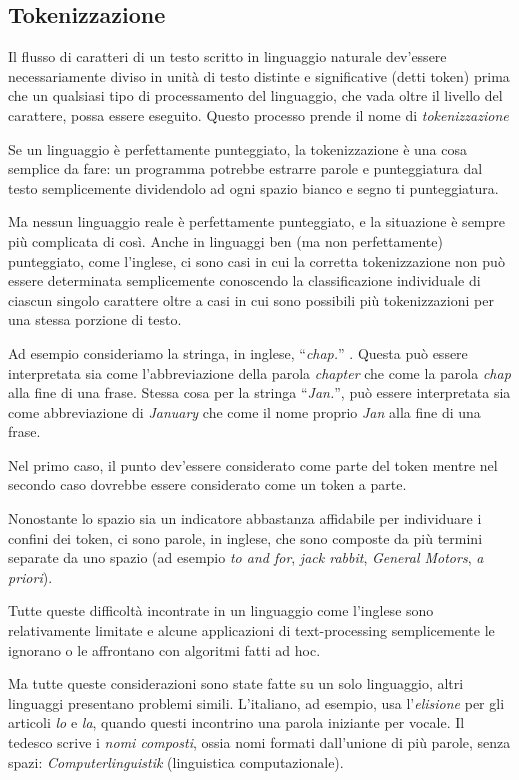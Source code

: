 \subsection{Tokenizzazione}

Il flusso di caratteri di un testo scritto in linguaggio naturale dev'essere
necessariamente diviso in unit\`a di testo distinte e significative (detti token)
prima che un qualsiasi tipo di processamento del linguaggio, che vada oltre il
livello del carattere, possa essere eseguito. Questo processo prende il nome di
\emph{tokenizzazione}

Se un linguaggio \`e perfettamente punteggiato, la tokenizzazione \`e una cosa
semplice da fare: un programma potrebbe estrarre parole e punteggiatura dal testo
semplicemente dividendolo ad ogni spazio bianco e segno ti punteggiatura.

Ma nessun linguaggio reale \`e perfettamente punteggiato, e la situazione \`e
sempre pi\`u complicata di cos\`i. Anche in linguaggi ben (ma non perfettamente)
punteggiato, come l'inglese, ci sono casi in cui la corretta tokenizzazione non
pu\`o essere determinata semplicemente conoscendo la classificazione individuale
di ciascun singolo carattere oltre a casi in cui sono possibili pi\`u tokenizzazioni
per una stessa porzione di testo.

Ad esempio consideriamo la stringa, in inglese, ``\emph{chap.}'' . Questa pu\`o
essere interpretata sia come l'abbreviazione della parola \emph{chapter} che come
la parola \emph{chap} alla fine di una frase. Stessa cosa per la stringa ``\emph{Jan.}'',
pu\`o essere interpretata sia come abbreviazione di \emph{January} che come il
nome proprio \emph{Jan} alla fine di una frase.

Nel primo caso, il punto dev'essere considerato come parte del token mentre nel
secondo caso dovrebbe essere considerato come un token a parte.

Nonostante lo spazio sia un indicatore abbastanza affidabile per individuare i
confini dei token, ci sono parole, in inglese, che sono composte da pi\`u termini
separate da uno spazio (ad esempio \emph{to and for}, \emph{jack rabbit},
\emph{General Motors}, \emph{a priori}).

Tutte queste difficolt\`a incontrate in un linguaggio come l'inglese sono
relativamente limitate e alcune applicazioni di text-processing semplicemente le
ignorano o le affrontano con algoritmi fatti ad hoc.

Ma tutte queste considerazioni sono state fatte su un solo linguaggio, altri
linguaggi presentano problemi simili. L'italiano, ad esempio, usa l'\emph{elisione}
per gli articoli \emph{lo} e \emph{la}, quando questi incontrino una parola
iniziante per vocale. Il tedesco scrive i \emph{nomi composti}, ossia nomi formati
dall'unione di pi\`u parole, senza spazi: \emph{Computerlinguistik} (linguistica
computazionale).

